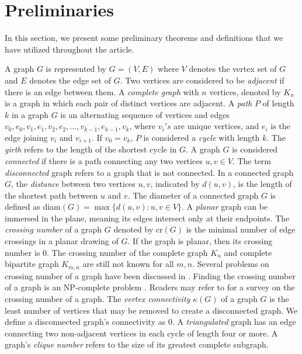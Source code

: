 \documentclass[12pt]{article}
\begin{document}
	
	
	\section{Preliminaries}
	\label{PL}
	In this section, we present some preliminary theorems and definitions that we have utilized throughout the article.
	
	A graph $G$ is represented by $G=(V,E)$ where $V$ denotes the vertex set of $G$ and $E$ denotes the edge set of $G$. 
	Two vertices are considered to be \textit{adjacent} if there is an edge between them.
	A \textit{complete graph} with $n$ vertices, denoted by $K_n$ is a graph in which each pair of distinct vertices are adjacent.
	A \textit{path} $P$ of length $k$ in a graph $G$ is an alternating sequence of vertices and edges $v_0, e_0, v_1, e_1, v_2, e_2, \ldots, v_{k-1}, e_{k-1}, v_k$, where $v_i's$ are unique vertices, and $e_i$ is the edge joining $v_i$ and $v_{i+1}$. 
	If $v_0=v_k$, $P$ is considered a \textit{cycle} with length $k$.
	The \textit{girth} refers to the length of the shortest cycle in $G$.
	A graph $G$ is considered \textit{connected} if there is a path connecting any two vertices $u,v\in V$.
	The term \textit{disconnected} graph refers to a graph that is not connected.
	In a connected graph $G$, the \textit{distance} between two vertices $u,v$, indicated by $d(u,v)$, is the length of the shortest path between $u$ and $v$.
	The diameter of a connected graph $G$ is defined as diam$(G)=\max\{ d(u,v):u,v\in V\}$.
	A \textit{planar} graph can be immersed in the plane, meaning its edges intersect only at their endpoints.
	The \textit{crossing number} of a graph $G$ denoted by $\text{cr}(G)$ is the minimal number of edge crossings in a planar drawing of $G$.
	If the graph is planar, then its crossing number is $0$.
	The crossing number of the complete graph $K_n$ and complete bipartite graph $K_{m,n}$ are still not known for all $m,n$. 
	Several problems on crossing number of a graph have been discussed in \cite{erdos1973crossing}. Finding the crossing number of a graph is an NP-complete problem \cite{garey1983crossing}.
	Readers may refer to \cite{schaefer2012graph} for a survey on the crossing number of a graph.
	The \textit{vertex connectivity} $\kappa(G)$ of a graph $G$ is the least number of vertices that may be removed to create a disconnected graph. We define a disconnected graph's connectivity as $0$.
	A \textit{triangulated} graph has an edge connecting two non-adjacent vertices in each cycle of length four or more.
	A graph's \textit{clique number} refers to the size of its greatest complete subgraph.
\end{document}
